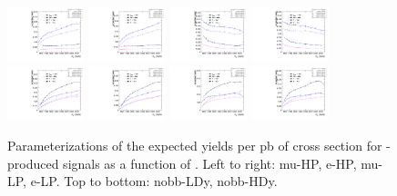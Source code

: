 \begin{figure}[htbp]
  \centering
  \includegraphics[width=0.2\textwidth]{fig/2Dfit/paramSignalYield_VBFSig_mu_HP_nobb_LDy.pdf}
  \includegraphics[width=0.2\textwidth]{fig/2Dfit/paramSignalYield_VBFSig_e_HP_nobb_LDy.pdf}
  \includegraphics[width=0.2\textwidth]{fig/2Dfit/paramSignalYield_VBFSig_mu_LP_nobb_LDy.pdf}
  \includegraphics[width=0.2\textwidth]{fig/2Dfit/paramSignalYield_VBFSig_e_LP_nobb_LDy.pdf}\\
  \includegraphics[width=0.2\textwidth]{fig/2Dfit/paramSignalYield_VBFSig_mu_HP_nobb_HDy.pdf}
  \includegraphics[width=0.2\textwidth]{fig/2Dfit/paramSignalYield_VBFSig_e_HP_nobb_HDy.pdf}
  \includegraphics[width=0.2\textwidth]{fig/2Dfit/paramSignalYield_VBFSig_mu_LP_nobb_HDy.pdf}
  \includegraphics[width=0.2\textwidth]{fig/2Dfit/paramSignalYield_VBFSig_e_LP_nobb_HDy.pdf}\\
  \caption{
    Parameterizations of the expected yields per pb of cross section for \VBF-produced signals as a function of \MX.
    Left to right: mu-HP, e-HP, mu-LP, e-LP.
    Top to bottom: nobb-LDy, nobb-HDy.
  }
  \label{fig:YieldParam_VBF_Run2}
\end{figure}

